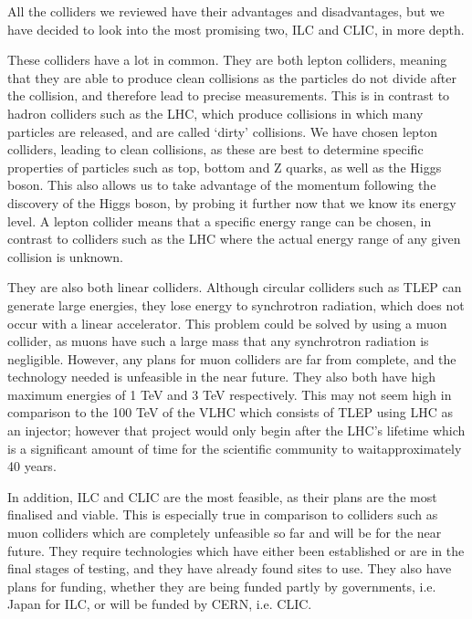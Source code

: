 All the colliders we reviewed have their advantages and disadvantages, but we have decided to look into the most promising two, ILC and CLIC, in more depth.

These colliders have a lot in common. They are both lepton colliders, meaning that they are able to produce clean collisions as the particles do not divide after the collision, and therefore lead to precise measurements. This is in contrast to hadron colliders such as the LHC, which produce collisions in which many particles are released, and are called `dirty' collisions. We have chosen lepton colliders, leading to clean collisions, as these are best to determine specific properties of particles such as top, bottom and Z quarks, as well as the Higgs boson. This also allows us to take advantage of the momentum following the discovery of the Higgs boson, by probing it further now that we know its energy level. A lepton collider means that a specific energy range can be chosen, in contrast to colliders such as the LHC where the actual energy range of any given collision is unknown.

They are also both linear colliders. Although circular colliders such as TLEP can generate large energies, they lose energy to synchrotron radiation, which does not occur with a linear accelerator. This problem could be solved by using a muon collider, as muons have such a large mass that any synchrotron radiation is negligible. However, any plans for muon colliders are far from complete, and the technology needed is unfeasible in the near future. They also both have high maximum energies of 1 TeV and 3 TeV respectively. This may not seem high in comparison to the 100 TeV of the VLHC which consists of TLEP using LHC as an injector; however that project would only begin after the LHC's lifetime which is a significant amount of time for the scientific community to wait\textendash  approximately 40 years.

In addition, ILC and CLIC are the most feasible, as their plans are the most finalised and viable. This is especially true in comparison to colliders such as muon colliders which are completely unfeasible so far and will be for the near future. They require technologies which have either been established or are in the final stages of testing, and they have already found sites to use. They also have plans for funding, whether they are being funded partly by governments, i.e. Japan for ILC, or will be funded by CERN, i.e. CLIC.